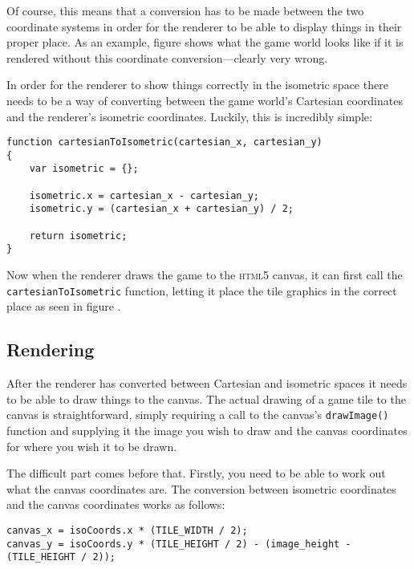 Of course, this means that a conversion has to be made between the two coordinate systems in order for the renderer to be able to display things in their proper place. As an example, figure  shows what the game world looks like if it is rendered without this coordinate conversion---clearly very wrong.

In order for the renderer to show things correctly in the isometric space there needs to be a way of converting between the game world's Cartesian coordinates and the renderer's isometric coordinates. Luckily, this is incredibly simple:

\noindent
\begin{minipage}{\linewidth}
\begin{lstlisting}[style=js, caption={JavaScript implementation of a function to turn Cartesian coordinates into game isometric coordinates. Original algorithm from \cite{citeulike:13155325}.}, label=cartesian_to_isometric]
function cartesianToIsometric(cartesian_x, cartesian_y)
{
	var isometric = {};

    isometric.x = cartesian_x - cartesian_y;
    isometric.y = (cartesian_x + cartesian_y) / 2;

    return isometric;
}
\end{lstlisting}
\end{minipage}

Now when the renderer draws the game to the \textsc{html5} canvas, it can first call the \texttt{cartesianToIsometric} function, letting it place the tile graphics in the correct place as seen in figure .

\subsection{Rendering}
After the renderer has converted between Cartesian and isometric spaces it needs to be able to draw things to the canvas. The actual drawing of a game tile to the canvas is straightforward, simply requiring a call to the canvas's \texttt{drawImage()} function and supplying it the image you wish to draw and the canvas coordinates for where you wish it to be drawn.

The difficult part comes before that. Firstly, you need to be able to work out what the canvas coordinates are. The conversion between isometric coordinates and the canvas coordinates works as follows:

\noindent
\begin{minipage}{\linewidth}
\begin{lstlisting}[style=js, caption={Conversion between isometric coordinates and canvas coordinates.}, label=isometric_to_canvas]
canvas_x = isoCoords.x * (TILE_WIDTH / 2);
canvas_y = isoCoords.y * (TILE_HEIGHT / 2) - (image_height - (TILE_HEIGHT / 2));
\end{lstlisting}
\end{minipage}

